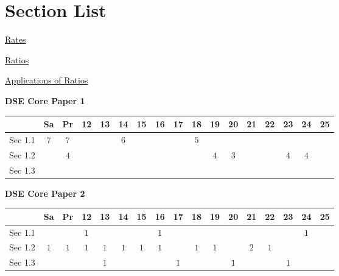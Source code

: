 \documentclass[12pt, a4paper]{article}
\begin{document}
\section*{Section List}
\begin{enumx}[label=Sec 1.\arabic*\ ]
\item \hyperref[section:2-1-1]{Rates}
\item \hyperref[section:2-1-2]{Ratios}
\item \hyperref[section:2-1-3]{Applications of Ratios}
\end{enumx}
\begin{absolutelynopagebreak}
\begin{center}
\textbf{DSE Core Paper 1}
\end{center}
\begin{center}
\begin{tabular}{|l|c|c|c|c|c|c|c|c|c|c|c|c|c|c|c|c|}
\hline
        & Sa & Pr & 12 & 13 & 14 & 15 & 16 & 17 & 18 & 19 & 20 & 21 & 22 & 23 & 24 & 25 \\\hline\hline
Sec 1.1 &  $7$ &  $7$ &  &  &  $6$ &  &  &  &  $5$ &  &  &  &  &  &  &  \\\hline
Sec 1.2 &  &  $4$ &  &  &  &  &  &  &  &  $4$ &  $3$ &  &  &  $4$ &  $4$ &  \\\hline
Sec 1.3 &  &  &  &  &  &  &  &  &  &  &  &  &  &  &  &  \\\hline
\end{tabular}
\end{center}
\end{absolutelynopagebreak}
\begin{absolutelynopagebreak}
\begin{center}
\textbf{DSE Core Paper 2}
\end{center}
\begin{center}
\begin{tabular}{|l|c|c|c|c|c|c|c|c|c|c|c|c|c|c|c|c|}
\hline
        & Sa & Pr & 12 & 13 & 14 & 15 & 16 & 17 & 18 & 19 & 20 & 21 & 22 & 23 & 24 & 25 \\\hline\hline
Sec 1.1 &  &  &  $1$ &  &  &  &  $1$ &  &  &  &  &  &  &  &  $1$ &  \\\hline
Sec 1.2 &  $1$ &  $1$ &  $1$ &  $1$ &  $1$ &  $1$ &  $1$ &  &  $1$ &  $1$ &  &  $2$ &  $1$ &  &  &  \\\hline
Sec 1.3 &  &  &  &  $1$ &  &  &  &  $1$ &  &  &  $1$ &  &  &  $1$ &  &  \\\hline
\end{tabular}
\end{center}
\end{absolutelynopagebreak}
\end{document}
